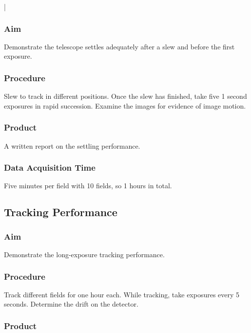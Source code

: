|\documentclass{article}
\begin{document}
\subsubsection{Aim}

Demonstrate the telescope settles adequately after a slew and before the first exposure.

\subsubsection{Procedure}

Slew to track in different positions. Once the slew has finished, take five 1 second exposures in rapid succession. Examine the images for evidence of image motion.

\subsubsection{Product}

A written report on the settling performance.

\subsubsection{Data Acquisition Time}

Five minutes per field with 10 fields, so 1 hours in total.


\subsection{Tracking Performance}

\subsubsection{Aim}

Demonstrate the long-exposure tracking performance.

\subsubsection{Procedure}

Track different fields for one hour each. While tracking, take exposures every 5 seconds. Determine the drift on the detector.

\subsubsection{Product}
\end{document}

